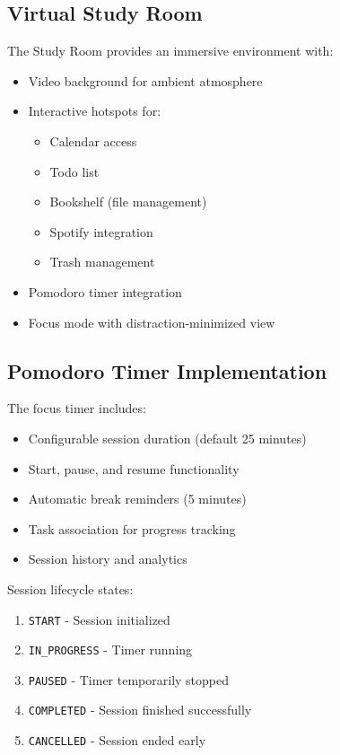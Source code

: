 \subsection{Virtual Study Room}
The Study Room provides an immersive environment with:
\begin{itemize}
    \item Video background for ambient atmosphere
    \item Interactive hotspots for:
    \begin{itemize}
        \item Calendar access
        \item Todo list
        \item Bookshelf (file management)
        \item Spotify integration
        \item Trash management
    \end{itemize}
    \item Pomodoro timer integration
    \item Focus mode with distraction-minimized view
\end{itemize}

\subsection{Pomodoro Timer Implementation}
The focus timer includes:
\begin{itemize}
    \item Configurable session duration (default 25 minutes)
    \item Start, pause, and resume functionality
    \item Automatic break reminders (5 minutes)
    \item Task association for progress tracking
    \item Session history and analytics
\end{itemize}

Session lifecycle states:
\begin{enumerate}
    \item \texttt{START} - Session initialized
    \item \texttt{IN\_PROGRESS} - Timer running
    \item \texttt{PAUSED} - Timer temporarily stopped
    \item \texttt{COMPLETED} - Session finished successfully
    \item \texttt{CANCELLED} - Session ended early
\end{enumerate}

